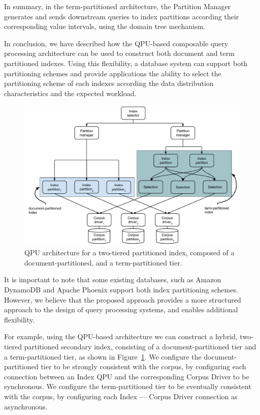 In summary, in the term-partitioned architecture,
the Partition Manager generates and sends downstream queries to index partitions according their corresponding
value intervals, using the domain tree mechanism.

In conclusion, we have described how the QPU-based composable query processing architecture can be used to construct both
document and term partitioned indexes.
Using this flexibility, a database system can support both partitioning schemes and provide applications the ability to
select the partitioning scheme of each indexes according the data distribution characteristics and the expected workload.

\begin{figure}
  \centering
    \includegraphics[width=\textwidth]{./figures/case_studies/index_partitioned_two_level.pdf}
  \caption{QPU architecture for a two-tiered partitioned index, composed of a document-partitioned, and a term-partitioned tier.}
  \label{fig:index_partitioned_two_level}
\end{figure}

It is important to note that some existing databases,
such as Amazon DynamoDB \cite{dynamodb:secondaryindexes} and Apache Phoenix \cite{phoenix:secondaryidnexing}
support both index partitioning schemes.
However, we believe that the proposed approach provides a more structured approach to the design of query processing systems,
and enables additional flexibility.

For example, using the QPU-based architecture we can construct a hybrid, two-tiered partitioned secondary index,
consisting of a document-partitioned tier and a term-partitioned tier, as shown in Figure~\ref{fig:index_partitioned_two_level}.
We configure the document-partitioned tier to be strongly consistent with the corpus,
by configuring each connection between an Index QPU and the corresponding Corpus Driver to be synchronous.
We configure the term-partitioned tier to be eventually consistent with the corpus,
by configuring each Index --- Corpus Driver connection as asynchronous.

